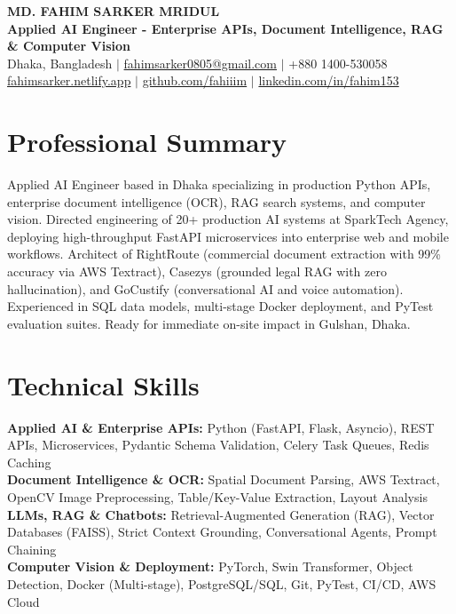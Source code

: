 \documentclass[9.5pt,a4paper]{article}
\begin{document}
{\centering
    {\Large \textbf{MD. FAHIM SARKER MRIDUL}}\\[1pt]
    \textbf{Applied AI Engineer - Enterprise APIs, Document Intelligence, RAG \& Computer Vision}\\[1pt]
    Dhaka, Bangladesh \;$\vert$\; \href{mailto:fahimsarker0805@gmail.com}{fahimsarker0805@gmail.com} \;$\vert$\; +880 1400-530058\\[1pt]
    \href{https://fahimsarker.netlify.app}{fahimsarker.netlify.app} \;$\vert$\; \href{https://github.com/fahiiim}{github.com/fahiiim} \;$\vert$\; \href{https://linkedin.com/in/fahim153}{linkedin.com/in/fahim153}\par
}

\vspace{-4.5pt}
\section*{Professional Summary}
Applied AI Engineer based in Dhaka specializing in production Python APIs, enterprise document intelligence (OCR), RAG search systems, and computer vision. Directed engineering of 20+ production AI systems at SparkTech Agency, deploying high-throughput FastAPI microservices into enterprise web and mobile workflows. Architect of RightRoute (commercial document extraction with 99\% accuracy via AWS Textract), Casezys (grounded legal RAG with zero hallucination), and GoCustify (conversational AI and voice automation). Experienced in SQL data models, multi-stage Docker deployment, and PyTest evaluation suites. Ready for immediate on-site impact in Gulshan, Dhaka.

\section*{Technical Skills}
\noindent
\textbf{Applied AI \& Enterprise APIs:} Python (FastAPI, Flask, Asyncio), REST APIs, Microservices, Pydantic Schema Validation, Celery Task Queues, Redis Caching\\
\textbf{Document Intelligence \& OCR:} Spatial Document Parsing, AWS Textract, OpenCV Image Preprocessing, Table/Key-Value Extraction, Layout Analysis\\
\textbf{LLMs, RAG \& Chatbots:} Retrieval-Augmented Generation (RAG), Vector Databases (FAISS), Strict Context Grounding, Conversational Agents, Prompt Chaining\\
\textbf{Computer Vision \& Deployment:} PyTorch, Swin Transformer, Object Detection, Docker (Multi-stage), PostgreSQL/SQL, Git, PyTest, CI/CD, AWS Cloud
\end{document}
